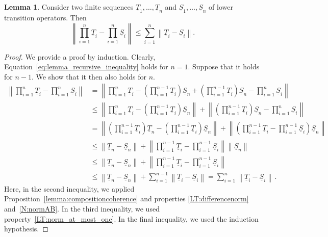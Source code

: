\documentclass[10pt,a4paper]{paper}
\theoremstyle{definition}
\newtheorem{lemma}[theorem]{Lemma}
\newcommand{\norm}[1]{\left\lVert #1 \right\rVert}
\begin{document}
\begin{lemma}\label{lemma:recursive_lower_trans}
Consider two finite sequences $\underline{T}_1,\ldots,\underline{T}_n$ and $\underline{S}_1,\ldots,\underline{S}_n$ of lower transition operators. Then
\begin{equation}\label{eq:lemma_recursive_inequality}
\norm{\prod_{i=1}^n\underline{T}_i - \prod_{i=1}^n\underline{S}_i} \leq \sum_{i=1}^n \norm{\underline{T}_i - \underline{S}_i}.
\end{equation}
\end{lemma}
\begin{proof}
We provide a proof by induction. Clearly, Equation~\eqref{eq:lemma_recursive_inequality} holds for $n=1$. Suppose that it holds for $n-1$. We show that it then also holds for $n$.
\begin{align*}
\norm{\prod_{i=1}^n\underline{T}_i - \prod_{i=1}^n\underline{S}_i} &= \norm{\prod_{i=1}^n\underline{T}_i - \left(\prod_{i=1}^{n-1}\underline{T}_i\right)\underline{S}_n + \left(\prod_{i=1}^{n-1}\underline{T}_i\right)\underline{S}_n - \prod_{i=1}^n\underline{S}_i} \\
 &\leq \norm{\prod_{i=1}^n\underline{T}_i - \left(\prod_{i=1}^{n-1}\underline{T}_i\right)\underline{S}_n} + \norm{\left(\prod_{i=1}^{n-1}\underline{T}_i\right)\underline{S}_n - \prod_{i=1}^n\underline{S}_i} \\
 &= \norm{\left(\prod_{i=1}^{n-1}\underline{T}_i\right)\underline{T}_n - \left(\prod_{i=1}^{n-1}\underline{T}_i\right)\underline{S}_n} + \norm{\left(\prod_{i=1}^{n-1}\underline{T}_i - \prod_{i=1}^{n-1}\underline{S}_i\right)\underline{S}_n} \\
 &\leq \norm{\underline{T}_n - \underline{S}_n} + \norm{\prod_{i=1}^{n-1}\underline{T}_i - \prod_{i=1}^{n-1}\underline{S}_i}\norm{\underline{S}_n} \\
 &\leq \norm{\underline{T}_n - \underline{S}_n} + \norm{\prod_{i=1}^{n-1}\underline{T}_i - \prod_{i=1}^{n-1}\underline{S}_i} \\
 &\leq \norm{\underline{T}_n - \underline{S}_n} + \sum_{i=1}^{n-1}\norm{\underline{T}_i - \underline{S}_i} = \sum_{i=1}^{n}\norm{\underline{T}_i - \underline{S}_i}\,.
\end{align*}
Here, in the second inequality, we applied Proposition~\ref{lemma:compositioncoherence} and properties \ref{LT:differencenorm} and~\ref{N:normAB}. In the third inequality, we used property~\ref{LT:norm_at_most_one}. In the final inequality, we used the induction hypothesis.
\end{proof}
\end{document}
